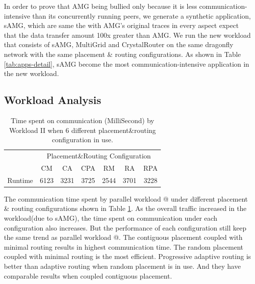\documentclass[conference,compsoc]{IEEEtran}
\makeatletter
\newcommand{\Rmnum}[1]{\expandafter\@slowromancap\romannumeral #1@}
\makeatother
\begin{document}
In order to prove that AMG being bullied only because it is less communication-intensive than its concurrently running peers, we generate a synthetic application, sAMG, which are same the with AMG's original traces in every aspect expect that the data transfer amount 100x greater than AMG. We run the new workload that consists of sAMG, MultiGrid and CrystalRouter on the same dragonfly network with the same placement \& routing configurations. As shown in Table \ref{tab:apps-detail}, sAMG become the most communication-intensive application in the new workload. 

\subsection{Workload Analysis}


\begin{table}[ht]
\begin{center}
\caption{Time spent on communication (MilliSecond) by Workload II when 6 different placement\&routing configuration in use.} 
\label{tab:syn-wkld-commtime}
\begin{tabular}{l c c c c c c }
\toprule %
\toprule
&\multicolumn{6}{c}{Placement\&Routing Configuration} \\ %
\cmidrule(l){2-7}
	 & CM & CA & CPA & RM & RA & RPA \\ %
\midrule %
Runtime  &  6123 & 3231 & 3725 & 2544 & 3701 & 3228 \\ %

\midrule %
\bottomrule %
\end{tabular}
\end{center}
\end{table}


The communication time spent by parallel workload \Rmnum{2} under different placement \& routing configurations shown in Table \ref{tab:syn-wkld-commtime}. As the overall traffic increased in the workload(due to sAMG), the time spent on communication under each configuration also increases. But the performance of each configuration still keep the same trend as parallel workload \Rmnum{1}. The contiguous placement coupled with minimal routing results in highest communication time. The random placement coupled with minimal routing is the most efficient. Progressive adaptive routing is better than adaptive routing when random placement is in use. And they have comparable results when coupled contiguous placement. 
\end{document}
